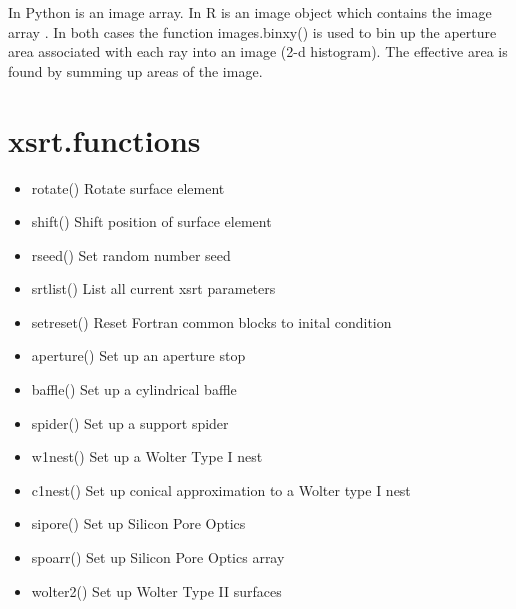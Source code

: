 \documentclass[letterpaper,10pt,english]{sphinxmanual}
\begin{document}
In Python  is an image array. In R  is an image object which
contains the image array .
In both cases the function images.binxy() is used to bin up the aperture area
associated with each ray into an image (2-d histogram). The effective area
is found by summing up areas of the image.


\section{xsrt.functions}
\label{\detokenize{xsrt_functions:xsrt-functions}}\label{\detokenize{xsrt_functions::doc}}
\begin{itemize}
\item {} 
rotate() Rotate surface element

\item {} 
shift() Shift position of surface element

\item {} 
rseed() Set random number seed

\item {} 
srtlist() List all current xsrt parameters

\item {} 
setreset() Reset Fortran common blocks to inital condition

\end{itemize}

\begin{itemize}
\item {} 
aperture() Set up an aperture stop

\item {} 
baffle() Set up a cylindrical baffle

\item {} 
spider() Set up a support spider

\end{itemize}

\begin{itemize}
\item {} 
w1nest() Set up a Wolter Type I nest

\item {} 
c1nest() Set up conical approximation to a Wolter type I nest

\item {} 
sipore() Set up Silicon Pore Optics

\item {} 
spoarr() Set up Silicon Pore Optics array

\item {} 
wolter2() Set up Wolter Type II surfaces

\end{itemize}
\end{document}
